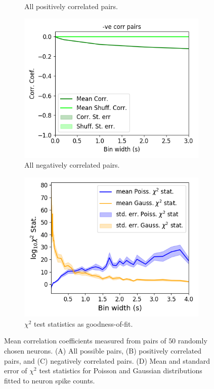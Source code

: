 \begin{figure}[p]
\begin{subfigure}[h]{0.5\linewidth}
            \caption{All positively correlated pairs.}
            \label{fig:correlations_pos_pairs}
        \end{subfigure}
        \begin{subfigure}[h]{0.5\linewidth}
            \includegraphics[width=\linewidth]{figures/eight_probe/Krebs_corr_neg_pairs.png}
            \caption{All negatively correlated pairs.}
            \label{fig:correlations_neg_pairs}
        \end{subfigure}
        \begin{subfigure}[h]{0.5\linewidth}
            \includegraphics[width=\linewidth]{figures/eight_probe/Krebs_stats_by_bin_width.png}
            \caption{$\chi^2$ test statistics as goodness-of-fit.}
            \label{fig:chi_squared_fits}
        \end{subfigure}
        \caption{Mean correlation coefficients measured from pairs of $50$ randomly chosen neurons. (A) All possible pairs, (B) positively correlated pairs, and (C) negatively correlated pairs. (D) Mean and standard error of $\chi^2$ test statistics for Poisson and Gaussian distributions fitted to neuron spike counts.}
        \label{fig:correlations_vs_bin_widths}
    \end{figure}

